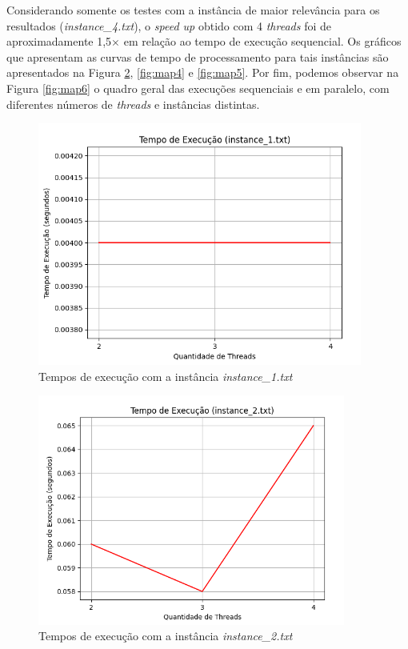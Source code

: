 \documentclass[a4paper, 12pt]{article}
\begin{document}
Considerando somente os testes com a instância de maior relevância para os resultados (\emph{instance\_4.txt}), o \emph{speed up} obtido com 4 \emph{threads} foi de aproximadamente 1,5\(\times\) em relação ao tempo de execução sequencial. Os gráficos que apresentam as curvas de tempo de processamento para tais instâncias são apresentados na Figura \ref{fig:map3}, \ref{fig:map4} e \ref{fig:map5}. Por fim, podemos observar na Figura \ref{fig:map6} o quadro geral das execuções sequenciais e em paralelo, com diferentes números de \emph{threads} e instâncias distintas.
\begin{figure}[H]
    \centering
    \includegraphics[width=0.95\textwidth]{Images/i1.png}
    \vspace*{-0.5cm}
    \caption{Tempos de execução com a instância \emph{instance\_1.txt}}
    \label{fig:map2}
\end{figure}

\begin{figure}[H]
    \centering
    \includegraphics[width=0.9\textwidth]{Images/i2.png}
    \vspace*{-0.2cm}
    \caption{Tempos de execução com a instância \emph{instance\_2.txt}}
    \label{fig:map3}
\end{figure}
\end{document}
